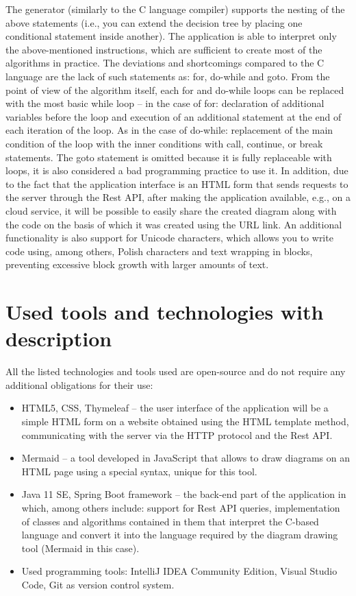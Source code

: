 The generator (similarly to the C language compiler) supports the nesting of the above statements (i.e., you can extend the decision tree by placing one conditional statement inside another). The application is able to interpret only the above-mentioned instructions, which are sufficient to create most of the algorithms in practice. The deviations and shortcomings compared to the C language are the lack of such statements as: for, do-while and goto. From the point of view of the algorithm itself, each for and do-while loops can be replaced with the most basic while loop -- in the case of for: declaration of additional variables before the loop and execution of an additional statement at the end of each iteration of the loop. As in the case of do-while: replacement of the main condition of the loop with the inner conditions with call, continue, or break statements. The goto statement is omitted because it is fully replaceable with loops, it is also considered a bad programming practice to use it. In addition, due to the fact that the application interface is an HTML form that sends requests to the server through the Rest API, after making the application available, e.g., on a cloud service, it will be possible to easily share the created diagram along with the code on the basis of which it was created using the URL link. An additional functionality is also support for Unicode characters, which allows you to write code using, among others, Polish characters and text wrapping in blocks, preventing excessive block growth with larger amounts of text.
  
\section{Used tools and technologies with description }
All the listed technologies and tools used are open-source and do not require any additional obligations for their use:

\begin{itemize}
	\item HTML5, CSS, Thymeleaf -- the user interface of the application will be a simple HTML form on a website obtained using the HTML template method, communicating with the server via the HTTP protocol and the Rest API.	
	
	\item Mermaid -- a tool developed in JavaScript that allows to draw diagrams on an HTML page using a special syntax, unique for this tool.
	
	\item Java 11 SE, Spring Boot framework -- the back-end part of the application in which, among others include: support for Rest API queries, implementation of classes and algorithms contained in them that interpret the C-based language and convert it into the language required by the diagram drawing tool (Mermaid in this case).
	
	\item Used programming tools: IntelliJ IDEA Community Edition, Visual Studio Code, Git as version control system.
		
		
\end{itemize}
	